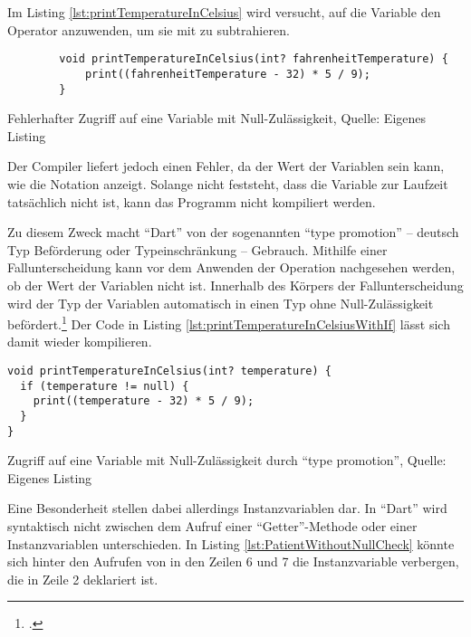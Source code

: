 Im Listing \ref{lst:printTemperatureInCelsius}
wird versucht, auf die Variable  den Operator \IC{-} anzuwenden, um sie mit  zu subtrahieren.


\ifIncludeFigures
  \begin{listing}[ht]
    \begin{verbatim}
        void printTemperatureInCelsius(int? fahrenheitTemperature) {
            print((fahrenheitTemperature - 32) * 5 / 9);
        }
\end{verbatim}
    \caption[Fehlerhafter Zugriff auf eine Variable mit Null-Zulässigkeit]{Fehlerhafter Zugriff auf eine Variable mit Null-Zulässigkeit, Quelle: Eigenes Listing}
    \label{lst:printTemperatureInCelsius}
  \end{listing}
\fi

Der Compiler liefert jedoch einen Fehler, da der Wert der Variablen  sein kann, wie die Notation  anzeigt.
Solange nicht feststeht, dass die Variable zur Laufzeit tatsächlich nicht  ist, kann das Programm nicht kompiliert werden.


Zu diesem Zweck macht \enquote{Dart} von der sogenannten \enquote{type promotion} -- deutsch Typ Beförderung oder Typeinschränkung -- Gebrauch.
Mithilfe einer Fallunterscheidung kann vor dem Anwenden der Operation nachgesehen werden, ob der Wert der Variablen nicht  ist.
Innerhalb des Körpers der Fallunterscheidung wird der Typ der Variablen automatisch in einen Typ ohne Null-Zulässigkeit befördert.\footcite[Vgl.][]{TypePromotionOnNullChecks}
Der Code in Listing \ref{lst:printTemperatureInCelsiusWithIf} lässt sich damit wieder kompilieren.

\ifIncludeFigures
  \begin{listing}[ht]
    \begin{verbatim}
void printTemperatureInCelsius(int? temperature) {
  if (temperature != null) {
    print((temperature - 32) * 5 / 9);
  }
}
\end{verbatim}
    \caption[Zugriff auf eine Variable mit Null-Zulässigkeit durch \enquote{type promotion}]{Zugriff auf eine Variable mit Null-Zulässigkeit durch \enquote{type promotion}, Quelle: Eigenes Listing}
    \label{lst:printTemperatureInCelsiusWithIf}
  \end{listing}
\fi

Eine Besonderheit stellen dabei allerdings Instanzvariablen dar.
In \enquote{Dart} wird syntaktisch nicht zwischen dem Aufruf einer \enquote{Getter}-Methode oder einer Instanzvariablen unterschieden.
In Listing \ref{lst:PatientWithoutNullCheck}
könnte sich hinter den Aufrufen von  in den Zeilen 6 und 7 die Instanzvariable verbergen, die in Zeile 2 deklariert ist.


